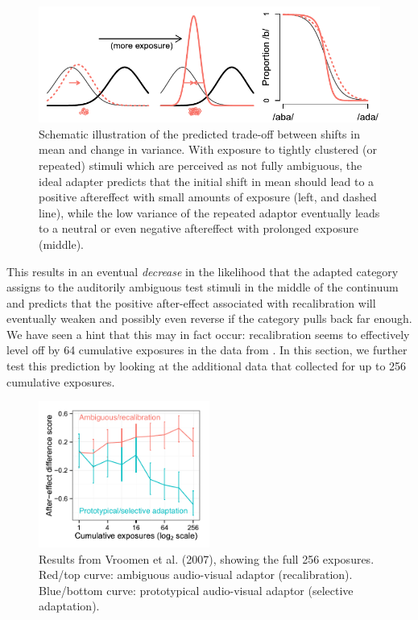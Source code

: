 \begin{figure}[htb]
  \centering
  \includegraphics[width=\textwidth]{schematic-recal.pdf}
  \caption{Schematic illustration of the predicted trade-off between shifts in mean and change in variance.  With exposure to tightly clustered (or repeated) stimuli which are perceived as not fully ambiguous, the ideal adapter predicts that the initial shift in mean should lead to a positive aftereffect with small amounts of exposure (left, and dashed line), while the low variance of the repeated adaptor eventually leads to a neutral or even negative aftereffect with prolonged exposure (middle).}
  \label{fig:mcgurk-preds-schematic}
\end{figure}

This results in an eventual \emph{decrease} in the likelihood that the adapted category assigns to the auditorily ambiguous test stimuli in the middle of the continuum and predicts that the positive after-effect associated with recalibration will eventually weaken and possibly even reverse if the category pulls back far enough.  We have seen a hint that this may in fact occur: recalibration seems to effectively level off by 64 cumulative exposures in the data from \textcite{Vroomen2007}.  In this section, we further test this prediction by looking at the additional data that \textcite{Vroomen2007} collected for up to 256 cumulative exposures.


\begin{figure}[htb]
  \centering
  \includegraphics[width=0.5\textwidth]{vroomen-ae-first.pdf}
  \caption{Results from Vroomen et al. (2007), showing the full 256 exposures.  Red/top curve: ambiguous audio-visual adaptor (recalibration).  Blue/bottom curve: prototypical audio-visual adaptor (selective adaptation).}
  \label{fig:vroomen-results-256}
\end{figure}

